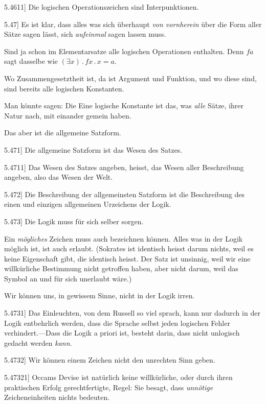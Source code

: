 \documentclass[12pt,oneside]{book}[2007/10/19]
\newcommand{\PropERef}[1]{\hyperref[PropE:#1]{#1}}
\newcommand{\PropositionG}[2]{%
  \item[\phantomsection\label{PropG:#1}\PropERef{#1}] #2%
}
\newcommand{\DotOp}{\mathbin{.}}
\newcommand{\Emph}[1]{\emph{#1}}%
\begin{document}
\begin{propositions}
\PropositionG{5.4611}
{Die logischen Operationszeichen sind Interpunktionen.}


\PropositionG{5.47}
{Es ist klar, dass alles was sich überhaupt \Emph{von
vornherein} über die Form aller Sätze sagen
lässt, sich \Emph{aufeinmal} sagen lassen muss.

Sind ja schon im Elementarsatze alle logischen
\enlargethispage{1pt} %
Operationen enthalten. Denn \glqq{}$fa$\grqq{} sagt dasselbe
wie \glqq{}$(\exists x) \DotOp fx \DotOp x = a$\grqq{}.

Wo Zusammengesetztheit ist, da ist Argument
und Funktion, und wo diese sind, sind bereits alle
logischen Konstanten.

Man könnte sagen: Die Eine logische Konstante
ist das, was \Emph{alle} Sätze, ihrer Natur nach, mit
einander gemein haben.

Das aber ist die allgemeine Satzform.}


\PropositionG{5.471}
{Die allgemeine Satzform ist das Wesen des
Satzes.}


\PropositionG{5.4711}
{Das Wesen des Satzes angeben, heisst, das
Wesen aller Beschreibung angeben, also das
Wesen der Welt.}


\PropositionG{5.472}
{Die Beschreibung der allgemeinsten Satzform
ist die Beschreibung des einen und einzigen
allgemeinen Urzeichens der Logik.}


\PropositionG{5.473}
{Die Logik muss für sich selber sorgen.

Ein \Emph{mögliches} Zeichen muss auch bezeichnen
können. Alles was in der Logik möglich ist, ist
auch erlaubt. (\glqq{}Sokrates ist identisch\grqq{} heisst darum
nichts, weil es keine Eigenschaft gibt, die
\glqq{}identisch\grqq{} heisst. Der Satz ist unsinnig, weil
wir eine willkürliche Bestimmung nicht getroffen
haben, aber nicht darum, weil das Symbol an und
für sich unerlaubt wäre.)

Wir können uns, in gewissem Sinne, nicht in
der Logik irren.}


\PropositionG{5.4731}
{Das Einleuchten, von dem Russell so viel
sprach, kann nur dadurch in der Logik entbehrlich
werden, dass die Sprache selbst jeden logischen
Fehler ver\-hin\-dert.---Dass die Logik a priori ist,
besteht darin, dass nicht unlogisch gedacht werden
\Emph{kann}.}


\PropositionG{5.4732}
{Wir können einem Zeichen nicht den unrechten
Sinn geben.}


\PropositionG{5.47321}
{Occams Devise ist natürlich keine willkürliche,
oder durch ihren praktischen Erfolg gerechtfertigte,
Regel: Sie besagt, dass \Emph{unnötige} Zeicheneinheiten
nichts bedeuten.

}
\end{propositions}
\end{document}
